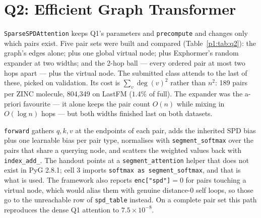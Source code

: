 \section{Q2: Efficient Graph Transformer}

\texttt{SparseSPDAttention} keeps Q1's parameters and \texttt{precompute} and changes only which
pairs exist. Five pair sets were built and compared (Table~\ref{p1:tab:q2}): the graph's edges
alone; plus one global virtual node; plus Exphormer's random expander at two widths; and the
2-hop ball --- every ordered pair at most two hops apart --- plus the virtual node. The
submitted class attends to the last of these, picked on validation. Its cost is
$\sum_v \deg(v)^2$ rather than $n^2$: 189 pairs per ZINC molecule, 804{,}349
on LastFM ($1.4\%$ of full). The expander was the a-priori favourite --- it alone keeps the
pair count $O(n)$ while mixing in $O(\log n)$ hops --- but both widths finished last on both
datasets.

\texttt{forward} gathers $q,k,v$ at the endpoints of each pair, adds the inherited SPD bias plus
one learnable bias per pair type, normalises with \texttt{segment\_softmax} over the pairs that
share a querying node, and scatters the weighted values back with \texttt{index\_\allowbreak{}add\_}. The
handout points at a \texttt{segment\_\allowbreak{}attention} helper that does not exist in PyG 2.8.1; cell 3
imports \texttt{softmax as\allowbreak{} segment\_\allowbreak{}softmax}, and that is what is used. The framework also
reports \texttt{enc["spd"]}$=0$ for pairs touching a virtual node, which would alias them with
genuine distance-$0$ self loops, so those go to the unreachable row of \texttt{spd\_table}
instead. On a complete pair set this path reproduces the dense Q1 attention to
$7.5\times10^{-8}$.

